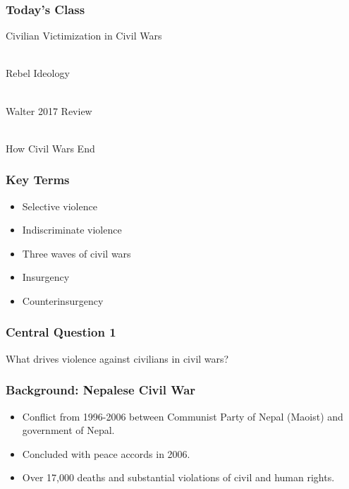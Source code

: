 \documentclass[handout]{beamer}
\begin{document}
	\begin{frame} 
	\frametitle{\LARGE{Today's Class}}
	\begin{itemize}
		\Large{
			\item Civilian Victimization in Civil Wars
			\\~\\ 
			\item Rebel Ideology
			\\~\\
			\item Walter 2017 Review
			\\~\\
			\item How Civil Wars End
		}
	\end{itemize}
\end{frame}

\begin{frame} 
	\frametitle{\LARGE{Key Terms}}
	\begin{itemize}
		\item Selective violence
		\item Indiscriminate violence
		\item Three waves of civil wars
		\item Insurgency
		\item Counterinsurgency
	\end{itemize}
\end{frame}

\begin{frame} 
	\frametitle{\LARGE{Central Question 1}}
	\centering
	\Large{What drives violence against civilians in civil wars?} 
\end{frame}

\begin{frame} 
	\frametitle{\LARGE{Background: Nepalese Civil War}}
	\begin{itemize}
		\item Conflict from 1996-2006 between Communist Party of Nepal (Maoist) and government of Nepal.
		\item Concluded with peace accords in 2006.
		\item Over 17,000 deaths and substantial violations of civil and human rights.
	\end{itemize}
\end{frame}
\end{document}
